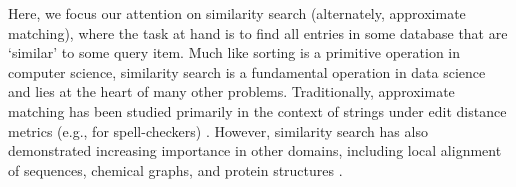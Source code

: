 \documentclass[review,preprint,12pt]{elsarticle}
\renewcommand{\cite}{\citep} %
\theoremstyle{definition}
\theoremstyle{remark}
\numberwithin{equation}{section}
\begin{document}
Here, we focus our attention on similarity search (alternately, approximate matching), where the task at hand is to find all entries in some database that are `similar' to some query item.
Much like sorting is a primitive operation in computer science, similarity search is a fundamental operation in data science and lies at the heart of many other problems.
Traditionally, approximate matching has been studied primarily in the context of strings under edit distance metrics (e.g., for spell-checkers) \cite{ukkonen1985algorithms}.
However, similarity search has also demonstrated increasing importance in other domains, including local alignment of sequences, chemical graphs, and protein structures \cite{altschul1990basic, kent2002blat, schaeffer2007graph, budowski2010fragbag}.
\end{document}
